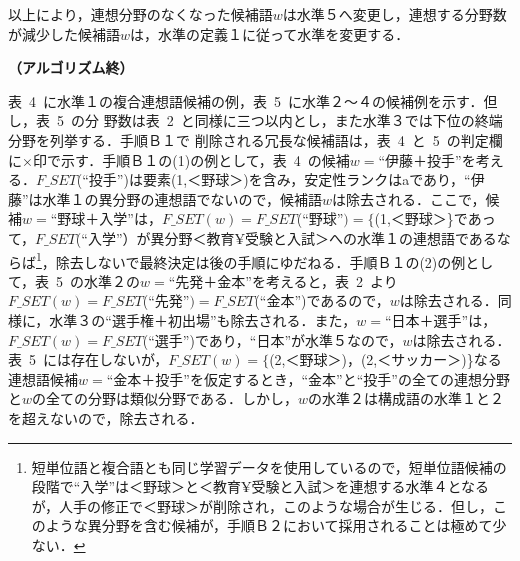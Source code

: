 以上により，連想分野のなくなった候補語$w$は水準５へ変更し，連想する分野数が減少した候補語$w$は，水準の定義１に従って水準を変更する．
\begin{flushright}
{\bf （アルゴリズム終）}
\end{flushright}

表~4~に水準１の複合連想語候補の例，表~5~に水準２〜４の候補例を示す．但し，表~5~の分\break
野数は表~2~と同様に三つ以内とし，また水準３では下位の終端分野を列挙する．手順Ｂ１で\break
削除される冗長な候補語は，表~4~と~5~の判定欄に×印で示す．手順Ｂ１の(1)の例として，表~4~の候補$w=\mbox{``伊藤＋投手''}$を考える．$F\_SET$(``投手'')は要素(1,＜野球＞)を含み，安定性ランクはaであり，``伊藤''は水準１の異分野の連想語でないので，候補語$w$\mbox{は除去され}る．ここで，候補$w=\mbox{``野球＋入学''}$は，$F\_SET(w)=F\_SET$(``野球''$)=\{$(1,＜野球＞\}であって，$F\_SET$(``入学''）が異分野＜教育¥受験と入試＞への水準１の連想語であるならば\footnote{短単位語と複合語とも同じ学習データを使用しているので，短単位語候補の段階で``入学''は＜野球＞と＜教育¥受験と入試＞を連想する水準４となるが，人手の修正で＜野球＞が削除され，このような場合が生じる．但し，このような異分野を含む候補が，手順Ｂ２において採用されることは極めて少ない．}，除去しないで最終決定は後の手順にゆだねる．手順Ｂ１の(2)の例として，表~5~の水準２の$w=\mbox{``先発＋金本''}$を考えると，表~2~より$F\_SET(w)=F\_SET$(``先発''$)=F\_SET$(``金本'')であるので，$w$は除去される．同様に，水準３の``選手権＋初出場''も除去される．また，$w=\mbox{``日本＋選手''}$は，$F\_SET(w)=F\_SET$(``選手'')であり，``日本''が水準５なので，$w$は除去される．表~5~には存在しないが，$F\_SET(w)=\{$(2,＜野球＞)，(2,＜サッカー＞)\}なる連想語候補$w=\mbox{``金本＋投手''}$を仮定するとき，``金本''と``投手''の全ての連想分野と$w$の全ての分野は類似分野である．しかし，$w$の水準２は構成語の水準１と２を超えないので，除去される．

